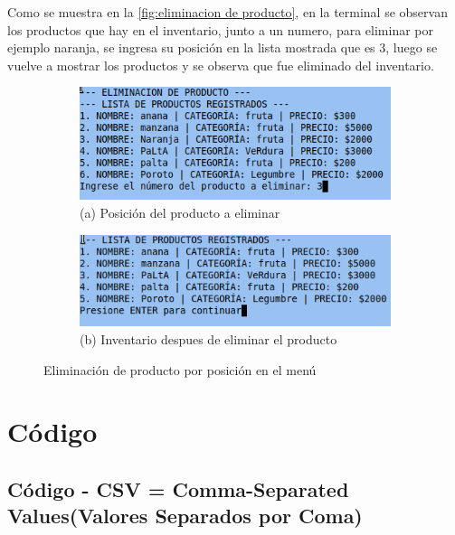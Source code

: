\documentclass[12pt]{article}
\begin{document}
Como se muestra en la \autoref{fig:eliminacion de producto}, en la terminal se observan los productos que hay en el inventario, junto a un numero, para eliminar por ejemplo naranja, se ingresa su posición en la lista mostrada que es $3$, luego se vuelve a mostrar los productos y se observa que fue eliminado del inventario.
\begin{figure}[H]
    \centering

    \begin{subfigure}[b]{0.6\textwidth}
        \centering
        \includegraphics[width=\textwidth]{Imagenes/img12.png}
        \caption*{(a) Posición del producto a eliminar}
    \end{subfigure}
    \hfill
    \begin{subfigure}[b]{0.6\textwidth}
        \centering
        \includegraphics[width=\textwidth]{Imagenes/img13.png}
        \caption*{(b) Inventario despues de eliminar el producto}
    \end{subfigure}

    \caption{Eliminación de producto por posición en el menú}
    \label{fig:eliminacion de producto}
\end{figure}

\section{Código}
\subsection{Código - CSV = Comma-Separated Values(Valores Separados por Coma)}
\end{document}
